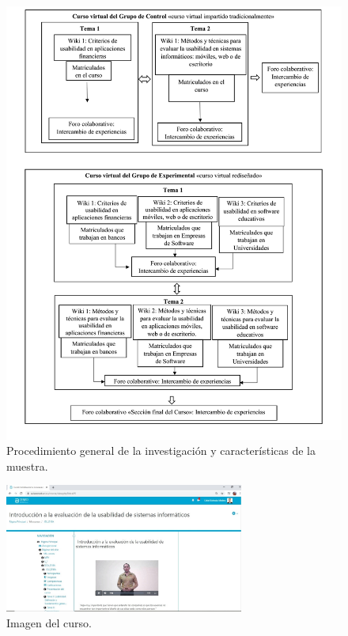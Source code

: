 \documentclass{textolivre}
\begin{document}
\begin{figure}[htbp]
 \centering
 \includegraphics[width=1\textwidth]{fig1.png}
 \caption{Procedimiento general de la investigación y características de la muestra.}
 \label{fig1}
\end{figure}

\begin{figure}[htbp]
 \centering
 \includegraphics[width=0.7\textwidth]{fig2.png}
 \caption{Imagen del curso.}
 \label{fig2}
\end{figure}
\end{document}
